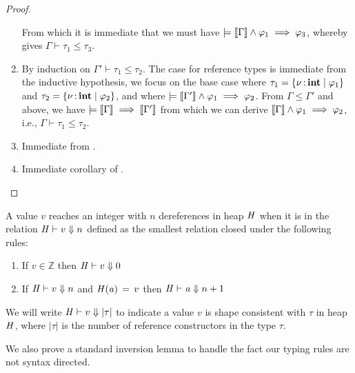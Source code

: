 \begin{proof}
\begin{enumerate}
    From which it is immediate that we must have $\models   \left\llbracket{ \Gamma }\right\rrbracket   \wedge  \varphi_{{\mathrm{1}}}  \implies  \varphi_{{\mathrm{3}}}$, whereby  gives $\Gamma  \vdash  \tau_{{\mathrm{1}}}  \leq  \tau_{{\mathrm{3}}}$.
  \item By induction on $\Gamma'  \vdash  \tau_{{\mathrm{1}}}  \leq  \tau_{{\mathrm{2}}}$. The case for reference types is immediate from the inductive hypothesis, we focus
    on the base case where $\tau_{{\mathrm{1}}}  =   \left\{{  \nu  \operatorname{:} \mathbf{int} \mid  \varphi_{{\mathrm{1}}} }\right\} $ and $\tau_{{\mathrm{2}}}  =   \left\{{  \nu  \operatorname{:} \mathbf{int} \mid  \varphi_{{\mathrm{2}}} }\right\} $, and where $\models   \left\llbracket{ \Gamma' }\right\rrbracket   \wedge  \varphi_{{\mathrm{1}}}  \implies  \varphi_{{\mathrm{2}}}$.
    From $\Gamma  \leq  \Gamma'$ and  above, we have $\models   \left\llbracket{ \Gamma }\right\rrbracket   \implies   \left\llbracket{ \Gamma' }\right\rrbracket $ from which we can derive $ \left\llbracket{ \Gamma }\right\rrbracket   \wedge  \varphi_{{\mathrm{1}}}  \implies  \varphi_{{\mathrm{2}}}$, i.e.,
    $\Gamma  \vdash  \tau_{{\mathrm{1}}}  \leq  \tau_{{\mathrm{2}}}$.
  \item Immediate from .
  \item Immediate corollary of .
  \end{enumerate}
\end{proof}

\begin{definition}
  A value $v$ reaches an integer with $n$ dereferences in heap $\mathit{H}$ when it is in the relation  $ \mathit{H} \vdash   v  \Downarrow  n $
  defined as the smallest relation closed under the following rules:
  \begin{enumerate}
  \item If $ v  \in  \mathbb{Z} $ then $ \mathit{H} \vdash   v  \Downarrow  0 $
  \item If $ \mathit{H} \vdash   v  \Downarrow  n $ and $\mathit{H}  (  \mathit{a}  ) \, = \, v$ then $ \mathit{H} \vdash   \mathit{a}  \Downarrow  n  +  1 $
  \end{enumerate}
  We will write $ \mathit{H} \vdash   v  \Downarrow   | \tau |  $ to indicate a value $v$ is shape consistent with $\tau$ in heap $\mathit{H}$, where
  $ | \tau | $ is the number of reference constructors in the type $\tau$.
\end{definition}

We also prove a standard inversion lemma to
handle the fact our typing rules are not syntax directed.

